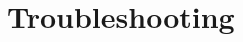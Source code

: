 \documentclass[a4paper,11pt,twoside,openright]{report}
\begin{document}


\section{Troubleshooting}
\end{document}
